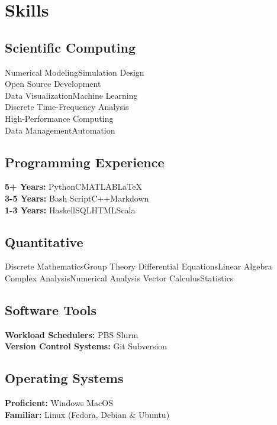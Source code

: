 \documentclass[letterpaper]{radler-resume-class}
\begin{document}
\begin{minipage}[t]{0.32\textwidth}
\section{Skills}
\sectionspace
\subsection{Scientific Computing}
Numerical Modeling\textbullet{}Simulation Design\\
\textbullet{}Open Source Development\\
\textbullet{}Data Visualization\textbullet{}Machine Learning\\
\textbullet{}Discrete Time-Frequency Analysis\\
\textbullet{}High-Performance Computing\\
\textbullet{}Data Management\textbullet{}Automation

\sectionspace

\subsection{Programming Experience}
\textbf{5+ Years:} Python\textbullet{}C\textbullet{}MATLAB\textbullet{}\LaTeX\\
\textbf{3-5 Years:} Bash Script\textbullet{}C++\textbullet{}Markdown\\
\textbf{1-3 Years:} Haskell\textbullet{}SQL\textbullet{}HTML\textbullet{}Scala

\sectionspace

\subsection{Quantitative}
\textbullet{}Discrete Mathematics\textbullet{}Group Theory
\textbullet{}Differential Equations\textbullet{}Linear Algebra
\textbullet{}Complex Analysis\textbullet{}Numerical Analysis
\textbullet{}Vector Calculus\textbullet{}Statistics

\sectionspace

\subsection{Software Tools}
\textbf{Workload Schedulers:} PBS \textbullet{} Slurm\\
\textbf{Version Control Systems:} Git \textbullet{} Subversion

\sectionspace

\subsection{Operating Systems}
\textbf{Proficient:} Windows \textbullet{} MacOS\\
\textbf{Familiar:} Linux (Fedora, Debian \& Ubuntu)

\end{minipage} %
\end{document}
